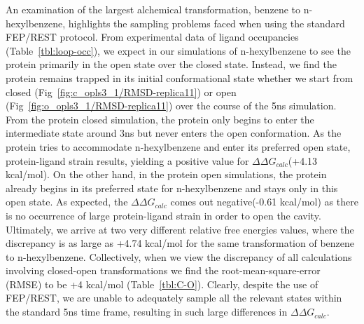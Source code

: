 \documentclass[journal=jctcce,manuscript=article]{achemso}
\begin{document}
An examination of the largest alchemical transformation, benzene to n-hexylbenzene, highlights the sampling problems faced when using the standard FEP/REST protocol.
From experimental data of ligand occupancies (Table~\ref{tbl:loop-occ}), we expect in our simulations of n-hexylbenzene to see the protein primarily in the open state over the closed state.
Instead, we find the protein remains trapped in its initial conformational state whether we start from closed (Fig~\ref{fig:c_opls3_1/RMSD-replica11}) or open (Fig~\ref{fig:o_opls3_1/RMSD-replica11}) over the course of the 5ns simulation.
From the protein closed simulation, the protein only begins to enter the intermediate state around 3ns but never enters the open conformation.
As the protein tries to accommodate n-hexylbenzene and enter its preferred open state, protein-ligand strain results, yielding a positive value for $\Delta\Delta G_{calc}$(+4.13 kcal/mol).
On the other hand, in the protein open simulations, the protein already begins in its preferred state for n-hexylbenzene and stays only in this open state.
As expected, the $\Delta\Delta G_{calc}$ comes out negative(-0.61 kcal/mol) as there is no occurrence of large protein-ligand strain in order to open the cavity.
Ultimately, we arrive at two very different relative free energies values, where the discrepancy is as large as +4.74 kcal/mol for the same transformation of benzene to n-hexylbenzene\footnotemark.
Collectively, when we view the discrepancy of all calculations involving closed-open transformations we find the root-mean-square-error (RMSE) to be +4 kcal/mol (Table~\ref{tbl:C-O}).  
Clearly, despite the use of FEP/REST, we are unable to adequately sample all the relevant states within the standard 5ns time frame, resulting in such large differences in $\Delta\Delta G_{calc}$.

\end{document}
